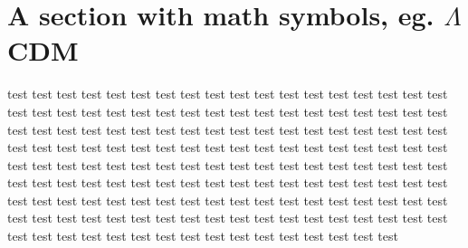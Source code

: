 \section{A section with math symbols, eg. \texorpdfstring{$\Lambda$}{Lambda}CDM}
test test test test test test test test test test test test test test test test test test test test test test test test test test test test test test test test test test test test test test test test
test test test test test test test test test test test test test test test test test test test test test test test test test test test test test test test test test test test test test test test test
test test test test test test test test test test test test test test test test test test test test test test test test test test test test test test test test test test test test test test test test
test test test test test test test test test test test test test test test test test test test test test test test test test test test test test test test test test test test test test test test test

